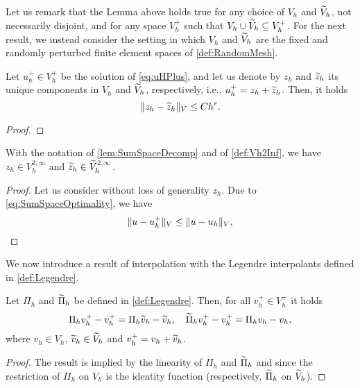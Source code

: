 \documentclass[10pt]{article}
\begin{document}
Let us remark that the Lemma above holds true for any choice of $V_h$ and $\widetilde V_h$, not necessarily disjoint, and for any space $V_h^+$ such that $V_h \cup \widetilde V_h \subseteq V_h^+$. For the next result, we instead consider the setting in which $V_h$ and $\widetilde V_h$ are the fixed and randomly perturbed finite element spaces of \cref{def:RandomMesh}. 

\begin{lemma}\label{lem:SumSpaceDecomp} Let $u_h^+ \in V_h^+$ be the solution of \eqref{eq:uHPlus}, and let us denote by $z_h$ and $\widetilde z_h$ its unique components in $V_h$ and $\widetilde V_h$, respectively, i.e., $u_h^+ = z_h + \widetilde z_h$. Then, it holds
	\begin{equation}
		\lVert z_h - \widetilde z_h\rVert_V \leq Ch^r.
	\end{equation}
\end{lemma}
\begin{proof}
	
\end{proof}

\begin{corollary} With the notation of \cref{lem:SumSpaceDecomp} and of \cref{def:Vh2Inf}, we have $z_h \in V_h^{2, \infty}$ and $\widetilde z_h \in \widetilde V_h^{2, \infty}$.
\end{corollary}
\begin{proof} Let us consider without loss of generality $z_h$. Due to \eqref{eq:SumSpaceOptimality}, we have
	\begin{equation}
		\lVert u - u_h^+\rVert_V \leq \lVert u - u_h\rVert_V,
	\end{equation}
\end{proof}


We now introduce a result of interpolation with the Legendre interpolants defined in \cref{def:Legendre}.

\begin{lemma}\label{lem:InterpSum} Let $\Pi_h$ and $\widetilde \Pi_h$ be defined in \cref{def:Legendre}. Then, for all $v_h^+ \in V_h^+$ it holds
	\begin{equation}
	\Pi_h v_h^+ - v_h^+ = \Pi_h \widetilde v_h - \widetilde v_h,  \quad 	\widetilde \Pi_h v^+_h - v_h^+ = \Pi_h v_h - v_h,
	\end{equation} 
	where $v_h \in V_h$, $\widetilde v_h \in \widetilde V_h$ and $v_h^+ = v_h + \widetilde v_h$.
\end{lemma}
\begin{proof} The result is implied by the linearity of $\Pi_h$ and $\widetilde \Pi_h$ and since the restriction of $\Pi_h$ on $V_h$ is the identity function (respectively, $\widetilde \Pi_h$ on $\widetilde V_h$).
\end{proof}
\end{document}
